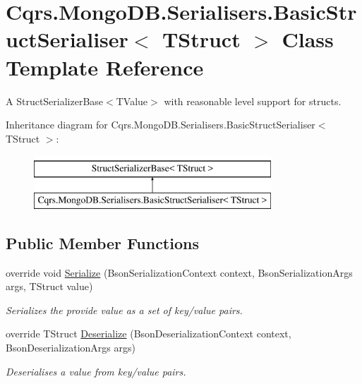 \hypertarget{classCqrs_1_1MongoDB_1_1Serialisers_1_1BasicStructSerialiser}{}\section{Cqrs.\+Mongo\+D\+B.\+Serialisers.\+Basic\+Struct\+Serialiser$<$ T\+Struct $>$ Class Template Reference}
\label{classCqrs_1_1MongoDB_1_1Serialisers_1_1BasicStructSerialiser}


A Struct\+Serializer\+Base$<$\+T\+Value$>$ with reasonable level support for structs.  


Inheritance diagram for Cqrs.\+Mongo\+D\+B.\+Serialisers.\+Basic\+Struct\+Serialiser$<$ T\+Struct $>$\+:\begin{figure}[H]
\begin{center}
\leavevmode
\includegraphics[height=2.000000cm]{classCqrs_1_1MongoDB_1_1Serialisers_1_1BasicStructSerialiser}
\end{center}
\end{figure}
\subsection*{Public Member Functions}
\begin{DoxyCompactItemize}
\item 
override void \hyperlink{classCqrs_1_1MongoDB_1_1Serialisers_1_1BasicStructSerialiser_afeddf8cf8fa5a761f01504795adafa9b_afeddf8cf8fa5a761f01504795adafa9b}{Serialize} (Bson\+Serialization\+Context context, Bson\+Serialization\+Args args, T\+Struct value)
\begin{DoxyCompactList}\small\item\em Serializes the provide {\itshape value}  as a set of key/value pairs. \end{DoxyCompactList}\item 
override T\+Struct \hyperlink{classCqrs_1_1MongoDB_1_1Serialisers_1_1BasicStructSerialiser_ad27304148a7a67b6c86c277254108c95_ad27304148a7a67b6c86c277254108c95}{Deserialize} (Bson\+Deserialization\+Context context, Bson\+Deserialization\+Args args)
\begin{DoxyCompactList}\small\item\em Deserialises a value from key/value pairs. \end{DoxyCompactList}\end{DoxyCompactItemize}


